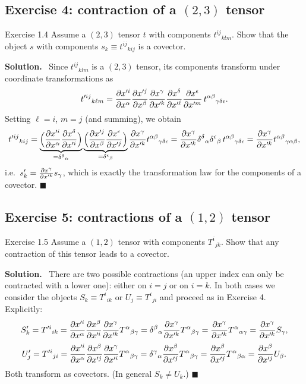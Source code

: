 \documentclass[11pt,a4paper]{article}
\numberwithin{equation}{subsection}
\newenvironment{solution}{\par\noindent\textbf{\textcolor{excol!70!black}{Solution.}}\ }{\hfill$\blacksquare$\par\medskip}
\newcommand{\added}[1]{{\color{teal!60!black}#1}}
\begin{document}
\subsection{Exercise 4: contraction of a $(2,3)$ tensor}
\begin{problem}{Exercise 1.4}
Assume a $(2,3)$ tensor $t$ with components $t^{ij}{}_{klm}$. Show that the object $s$ with components $s_k\equiv t^{ij}{}_{kij}$ is a covector.
\end{problem}
\begin{solution}
Since $t^{ij}{}_{klm}$ is a $(2,3)$ tensor, its components transform under coordinate transformations as
\[
  t'^{ij}{}_{k\ell m}=\frac{\partial x'^i}{\partial x^\alpha}\frac{\partial x'^j}{\partial x^\beta}\frac{\partial x^\gamma}{\partial x'^k}\frac{\partial x^\delta}{\partial x'^\ell}\frac{\partial x^\epsilon}{\partial x'^m}\,t^{\alpha\beta}{}_{\gamma\delta\epsilon}.
\]
Setting $\ell=i$, $m=j$ (and summing), we obtain
\[
  t'^{ij}{}_{kij}=\underbrace{\Big(\frac{\partial x'^i}{\partial x^\alpha}\frac{\partial x^\delta}{\partial x'^i}\Big)}_{=\delta^\delta{}_\alpha}\underbrace{\Big(\frac{\partial x'^j}{\partial x^\beta}\frac{\partial x^\epsilon}{\partial x'^j}\Big)}_{=\delta^\epsilon{}_\beta}\frac{\partial x^\gamma}{\partial x'^k}t^{\alpha\beta}{}_{\gamma\delta\epsilon}
  =\frac{\partial x^\gamma}{\partial x'^k}\delta^\delta{}_\alpha\delta^\epsilon{}_\beta\,t^{\alpha\beta}{}_{\gamma\delta\epsilon}=\frac{\partial x^\gamma}{\partial x'^k}t^{\alpha\beta}{}_{\gamma\alpha\beta},
\]
i.e.\ $s'_k=\frac{\partial x^\gamma}{\partial x'^k}s_\gamma$, which is exactly the transformation law for the components of a covector.
\end{solution}

\subsection{Exercise 5: contractions of a $(1,2)$ tensor}
\begin{problem}{Exercise 1.5}
Assume a $(1,2)$ tensor with components $T^i{}_{jk}$. Show that any contraction of this tensor leads to a covector.
\end{problem}
\begin{solution}
There are two possible contractions (an upper index can only be contracted with a lower one): either on $i=j$ or on $i=k$. In both cases we consider the objects $S_k\equiv T^i{}_{ik}$ or $U_j\equiv T^i{}_{ji}$ and proceed as in Exercise 4. \added{Explicitly:}
\[
  S'_k=T'^i{}_{ik}=\frac{\partial x'^i}{\partial x^\alpha}\frac{\partial x^\beta}{\partial x'^i}\frac{\partial x^\gamma}{\partial x'^k}T^\alpha{}_{\beta\gamma}=\delta^\beta{}_\alpha\frac{\partial x^\gamma}{\partial x'^k}T^\alpha{}_{\beta\gamma}=\frac{\partial x^\gamma}{\partial x'^k}T^\alpha{}_{\alpha\gamma}=\frac{\partial x^\gamma}{\partial x'^k}S_\gamma ,
\]
\[
  U'_j=T'^i{}_{ji}=\frac{\partial x'^i}{\partial x^\alpha}\frac{\partial x^\beta}{\partial x'^j}\frac{\partial x^\gamma}{\partial x'^i}T^\alpha{}_{\beta\gamma}=\delta^\gamma{}_\alpha\frac{\partial x^\beta}{\partial x'^j}T^\alpha{}_{\beta\gamma}=\frac{\partial x^\beta}{\partial x'^j}T^\alpha{}_{\beta\alpha}=\frac{\partial x^\beta}{\partial x'^j}U_\beta .
\]
Both transform as covectors. (In general $S_k\neq U_k$.)
\end{solution}
\end{document}
